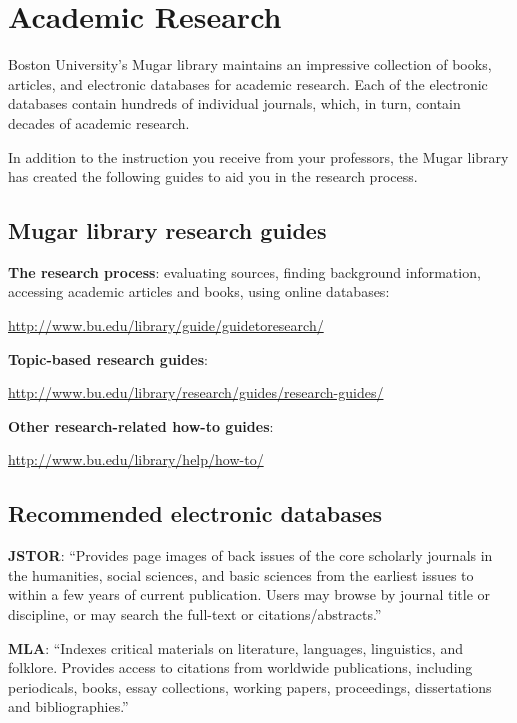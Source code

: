 
\section{\textcolor{ForrestGreen}{Academic Research}}

Boston University's Mugar library maintains an impressive collection of books, articles, and electronic databases for academic research. Each of the electronic databases contain hundreds of individual journals, which, in turn, contain decades of academic research.

In addition to the instruction you receive from your professors, the Mugar library has created the following guides to aid you in the research process.

\subsection{Mugar library research guides}

\textbf{The research process}: evaluating sources, finding background information, accessing academic articles and books, using online databases: 

\url {http://www.bu.edu/library/guide/guidetoresearch/}

\textbf{Topic-based research guides}:

\url{http://www.bu.edu/library/research/guides/research-guides/}

\textbf{Other research-related how-to guides}:

\url{http://www.bu.edu/library/help/how-to/}

\subsection{Recommended electronic databases}


\textbf{JSTOR}: ``Provides page images of back issues of the core scholarly journals in the humanities, social sciences, and basic sciences from the earliest issues to within a few years of current publication. Users may browse by journal title or discipline, or may search the full-text or citations/abstracts.''

\textbf{MLA}: ``Indexes critical materials on literature, languages, linguistics, and folklore. Provides access to citations from worldwide publications, including periodicals, books, essay collections, working papers, proceedings, dissertations and bibliographies.''

